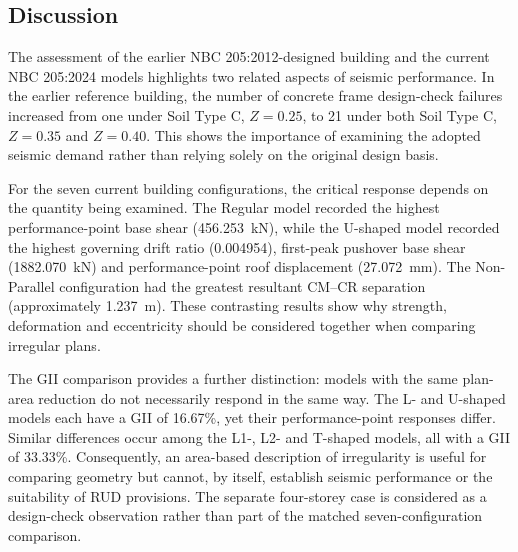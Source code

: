 \FloatBarrier
\subsection{Discussion}
The assessment of the earlier NBC 205:2012-designed building and the current NBC 205:2024 models highlights two related aspects of seismic performance. In the earlier reference building, the number of concrete frame design-check failures increased from one under Soil Type C, $Z=0.25$, to 21 under both Soil Type C, $Z=0.35$ and $Z=0.40$. This shows the importance of examining the adopted seismic demand rather than relying solely on the original design basis.

For the seven current building configurations, the critical response depends on the quantity being examined. The Regular model recorded the highest performance-point base shear (456.253~kN), while the U-shaped model recorded the highest governing drift ratio (0.004954), first-peak pushover base shear (1882.070~kN) and performance-point roof displacement (27.072~mm). The Non-Parallel configuration had the greatest resultant CM--CR separation (approximately 1.237~m). These contrasting results show why strength, deformation and eccentricity should be considered together when comparing irregular plans.

The GII comparison provides a further distinction: models with the same plan-area reduction do not necessarily respond in the same way. The L- and U-shaped models each have a GII of 16.67\%, yet their performance-point responses differ. Similar differences occur among the L1-, L2- and T-shaped models, all with a GII of 33.33\%. Consequently, an area-based description of irregularity is useful for comparing geometry but cannot, by itself, establish seismic performance or the suitability of RUD provisions. The separate four-storey case is considered as a design-check observation rather than part of the matched seven-configuration comparison.
\FloatBarrier
